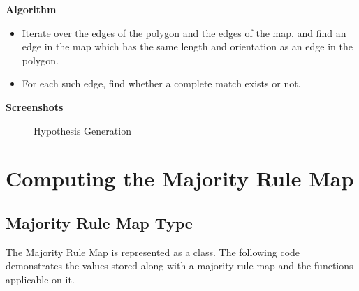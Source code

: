 \documentclass[a4paper,10pt]{article}
\begin{document}
{\bf Algorithm}

\begin{itemize}
 \item Iterate over the edges of the polygon and the edges of the map. and find an edge in the map which has the same length and
 orientation as an edge in the polygon.

 \item
 For each such edge, find whether a complete match exists or not.

\end{itemize}

{\bf Screenshots}

\begin{figure}[h]
\begin{center}
\caption{\label{fig:Hypothesis Generation}Hypothesis Generation}
\end{center}
\end{figure}



\newpage

\section{Computing the Majority Rule Map}

\subsection{Majority Rule Map Type}

The Majority Rule Map is represented as a class. The following code demonstrates the values stored along with a majority rule map and the 
functions applicable on it.
\end{document}
